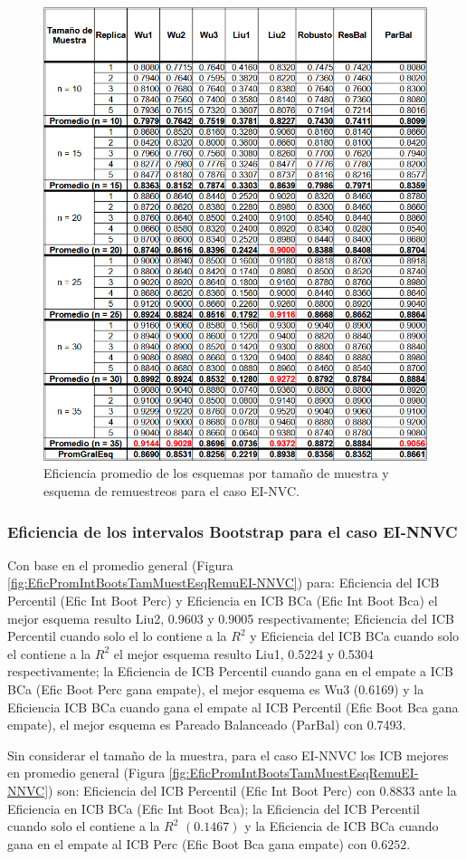 \begin{figure}[ht] 
	\centering 
	\includegraphics[width=0.70\linewidth]{img/EI_NVC_Efic_Esq.png} 
	\caption{Eficiencia promedio de los esquemas por tamaño de muestra y esquema de remuestreos para el caso EI-NVC.} 
	\label{fig:EficPromEsqTamMuesEsqRemuEI-NVC}
\end{figure}
\FloatBarrier



\subsubsection{Eficiencia de los intervalos Bootstrap para el caso EI-NNVC}
Con base en el promedio general (Figura \ref{fig:EficPromIntBootsTamMuestEsqRemuEI-NNVC}) para: Eficiencia del ICB Percentil (Efic Int Boot Perc) y Eficiencia en ICB BCa (Efic Int Boot Bca) el mejor esquema resulto Liu2, 0.9603 y 0.9005 respectivamente;
 Eficiencia del ICB Percentil cuando solo el lo contiene a la $R^{2}$ y Eficiencia del ICB BCa cuando solo el contiene a la $R^{2}$ el mejor esquema resulto Liu1, 0.5224 y 0.5304 respectivamente; la Eficiencia de ICB Percentil cuando gana en el empate a ICB BCa (Efic Boot Perc gana empate), el mejor esquema es Wu3 (0.6169) y la Eficiencia ICB BCa cuando gana el empate al ICB Percentil (Efic Boot Bca gana empate), el mejor esquema es Pareado Balanceado (ParBal) con 0.7493.
\vspace{.5cm}

Sin considerar el tamaño de la muestra, para el caso EI-NNVC los ICB mejores en promedio general (Figura \ref{fig:EficPromIntBootsTamMuestEsqRemuEI-NNVC}) son: Eficiencia del ICB Percentil (Efic Int Boot Perc) con $0.8833$ ante la Eficiencia en ICB BCa (Efic Int Boot Bca); la Eficiencia del ICB Percentil cuando solo el contiene a la $R^{2}$ $(0.1467)$ y la Eficiencia de ICB BCa cuando gana en el empate al ICB Perc (Efic Boot Bca gana empate) con $0.6252$.


